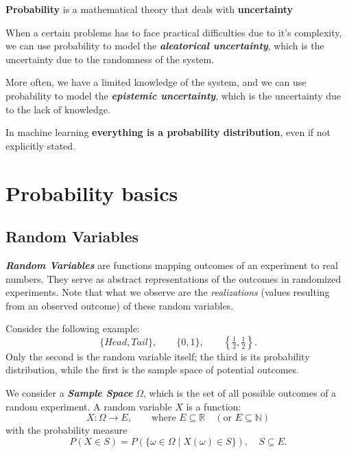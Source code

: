 \textbf{Probability} is a mathematical theory that deals with \textbf{uncertainty}

When a certain problems has to face practical difficulties due to it's complexity, we can use probability to model the \textbf{\textit{aleatorical uncertainty}}, which is the uncertainty due to the randomness of the system. 

More often, we have a limited knowledge of the system, and we can use probability to model the \textbf{\textit{epistemic uncertainty}}, which is the uncertainty due to the lack of knowledge.

\begin{tipsblock}
    In machine learning \textbf{everything is a probability distribution}, even if not explicitly stated.
\end{tipsblock}

\section{Probability basics}

\subsection{Random Variables}

\textbf{\textit{Random Variables}} are functions mapping outcomes of an experiment to real numbers. They serve as abstract representations of the outcomes in randomized experiments. Note that what we observe are the \textit{realizations} (values resulting from an observed outcome) of these random variables.

\begin{exampleblock}
Consider the following example:
$$
\{Head, Tail\}, \quad \quad
\{0, 1\}, \quad \quad
\left\{\tfrac{1}{2}, \tfrac{1}{2}\right\}.
$$
Only the second is the random variable itself; the third is its probability distribution, while the first is the sample space of potential outcomes.
\end{exampleblock}

We consider a \textbf{\textit{Sample Space}} $\Omega$, which is the set of all possible outcomes of a random experiment. A random variable $X$ is a function:
$$
X: \Omega \rightarrow E, \qquad \text{where } E \subseteq \mathbb{R} \quad (\text{or } E \subseteq \mathbb{N})
$$
with the probability measure 
$$
P(X \in S) = P(\{\omega \in \Omega \mid X(\omega) \in S\}), \quad S \subseteq E.
$$

